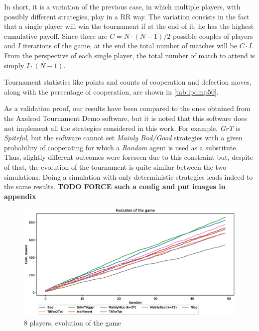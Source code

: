\documentclass[journal,a4paper,10pt,twoside]{IEEEtran} %
\begin{document}
In short, it is a variation of the previous case, in which multiple players, with possibly different strategies, play in a RR way. The variation consists in the fact that a single player will win the tournament if at the end of it, he has the highest cumulative payoff.
Since there are $C=N\cdot (N-1)/2$ possible couples of players and $I$ iterations of the game, at the end the total number of matches will be $C\cdot I$. From the perspective of each single player, the total number of match to attend is simply $I\cdot(N-1)$.

Tournament statistics like points and counts of cooperation and defection moves, along with the percentage of cooperation, are shown in \autoref{tab:ipdmp50}.

As a validation proof, our results have been compared to the ones obtained from the Axelrod Tournament Demo software, \cite{demosw} but it is noted that this software does not implement all the strategies considered in this work. For example, \textit{GrT} is \textit{Spiteful}, but the software cannot set \textit{Mainly Bad/Good} strategies with a given probability of cooperating for which a \textit{Random} agent is used as a substitute. Thus, slightly different outcomes were foreseen due to this constraint but, despite of that, the evolution of the tournament is quite similar between the two simulations.
Doing a simulation with only deterministic strategies leads indeed to the same results. \textbf{TODO FORCE such a config and put images in appendix}

\begin{figure}[!ht]
    \centering
	\includegraphics[width=1\columnwidth]{../img/ipdmp/ipdmp-evolution-of-game-8}
	\caption{8 players, evolution of the game}
	\label{fig:boxIPDMPevo8}
\end{figure}
\end{document}
